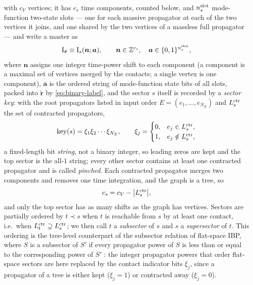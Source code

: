 \documentclass[11pt,a4paper]{article}
\numberwithin{table}{section}
\begin{document}
with $c_V$ vertices; it has $c_s$ time components, counted below, and $n^{\rm slot}_s$ mode-function two-state
slots --- one for each massive
propagator at each of the two vertices it joins, and one shared by the two vertices of a massless
full propagator --- and write a master as
\begin{equation}
  \text{I}_{\tilde{\bm r}}\equiv \text{I}_{s}(\bm n;\bm a),
  \qquad \bm n\in\mathbb Z^{c_s},\quad \bm a\in\{0,1\}^{n^{\rm slot}_s},
  \label{eq:graph-index}
\end{equation}
where $\bm n$ assigns one integer time-power shift to each component (a component is a maximal set
of vertices merged by the contacts; a single vertex is one component), $\bm a$ is the ordered
string of mode-function state bits of all slots, packed into $\tilde{\bm r}$ by \eqref{eq:binary-label}, and the
sector $s$ itself is recorded by a \emph{sector key}: with the root propagators listed in input
order $E=(e_1,\dots,e_{N_E})$ and $L_s^{\rm ctr}$ the set of contracted propagators,
\begin{equation}
  \operatorname{key}(s)=\xi_1\xi_2\cdots\xi_{N_E},
  \qquad \xi_j=\begin{cases}0,&e_j\in L_s^{\rm ctr},\\1,&e_j\notin L_s^{\rm ctr},\end{cases}
  \label{eq:sector-key}
\end{equation}
a fixed-length bit \emph{string}, not a binary integer, so leading zeros are kept and the top
sector is the all-$1$ string; every other sector contains at least one contracted propagator and
is called \emph{pinched}. Each contracted propagator merges two components and removes one time
integration, and the graph is a tree, so
\begin{equation}
  c_s=c_V-\big|L_s^{\rm ctr}\big|,
  \label{eq:component-count}
\end{equation}
and only the top sector has as many shifts as the graph has vertices. Sectors are partially ordered
by $t\prec s$ when $t$ is reachable from $s$ by at least one contact, i.e.\ when
$L_t^{\rm ctr}\supsetneq L_s^{\rm ctr}$; we then call $t$ a \emph{subsector} of $s$ and $s$ a
\emph{supersector} of $t$. This ordering is the tree-level counterpart of the subsector relation of
flat-space IBP, where $S$ is a subsector of $S'$ if every propagator
power of $S$ is less than or equal to the corresponding power of $S'$ \cite{Klappert:2020nbg}: the
integer propagator powers that order flat-space sectors are here replaced by the contact indicator
bits $\xi_j$, since a propagator of a tree is either kept ($\xi_j=1$) or contracted away
($\xi_j=0$).
\end{document}
